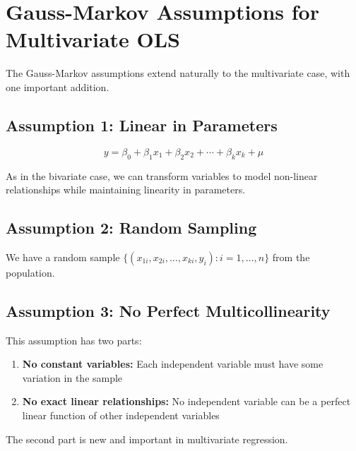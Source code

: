 \documentclass[
  letterpaper,
  DIV=11,
  numbers=noendperiod]{scrreprt}
\providecommand{\tightlist}{%
  \setlength{\itemsep}{0pt}\setlength{\parskip}{0pt}}
\begin{document}
\section{Gauss-Markov Assumptions for Multivariate
OLS}\label{gauss-markov-assumptions-for-multivariate-ols}

The Gauss-Markov assumptions extend naturally to the multivariate case,
with one important addition.

\subsection{Assumption 1: Linear in
Parameters}\label{assumption-1-linear-in-parameters-1}

\[
y = \beta_0 + \beta_1 x_1 + \beta_2 x_2 + \cdots + \beta_k x_k + \mu
\]

As in the bivariate case, we can transform variables to model non-linear
relationships while maintaining linearity in parameters.

\subsection{Assumption 2: Random
Sampling}\label{assumption-2-random-sampling-1}

We have a random sample
\(\{(x_{1i}, x_{2i}, \ldots, x_{ki}, y_i) : i = 1, \ldots, n\}\) from
the population.

\subsection{Assumption 3: No Perfect
Multicollinearity}\label{assumption-3-no-perfect-multicollinearity}

This assumption has two parts:

\begin{enumerate}
\def\labelenumi{\arabic{enumi}.}
\tightlist
\item
  \textbf{No constant variables:} Each independent variable must have
  some variation in the sample
\item
  \textbf{No exact linear relationships:} No independent variable can be
  a perfect linear function of other independent variables
\end{enumerate}

The second part is new and important in multivariate regression.
\end{document}
